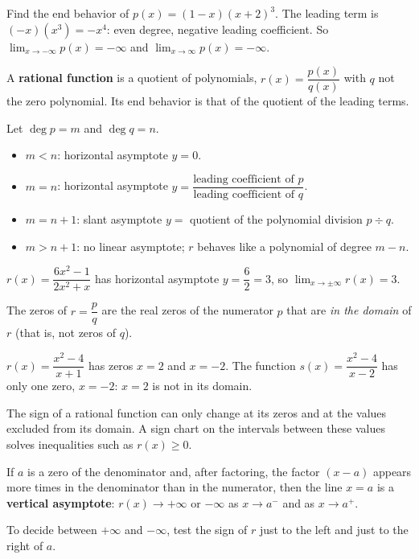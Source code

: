 \documentclass[11pt]{article}
\begin{document}
\begin{example}
Find the end behavior of $p(x)=(1-x)(x+2)^3$.
\sol The leading term is $(-x)(x^3)=-x^4$: even degree, negative leading coefficient. So $\lim_{x\to-\infty}p(x)=-\infty$ and $\lim_{x\to\infty}p(x)=-\infty$.
\end{example}

A \textbf{rational function} is a quotient of polynomials, $r(x)=\dfrac{p(x)}{q(x)}$ with $q$ not the zero polynomial. Its end behavior is that of the quotient of the leading terms.

\begin{keyidea}
Let $\deg p=m$ and $\deg q=n$.
\begin{itemize}
\item $m<n$: horizontal asymptote $y=0$.
\item $m=n$: horizontal asymptote $y=\dfrac{\text{leading coefficient of } p}{\text{leading coefficient of } q}$.
\item $m=n+1$: slant asymptote $y=$ quotient of the polynomial division $p\div q$.
\item $m>n+1$: no linear asymptote; $r$ behaves like a polynomial of degree $m-n$.
\end{itemize}
\end{keyidea}

\begin{example}
$r(x)=\dfrac{6x^2-1}{2x^2+x}$ has horizontal asymptote $y=\dfrac{6}{2}=3$, so $\lim_{x\to\pm\infty}r(x)=3$.
\end{example}

\begin{keyidea}
The zeros of $r=\dfrac{p}{q}$ are the real zeros of the numerator $p$ that are \emph{in the domain} of $r$ (that is, not zeros of $q$).
\end{keyidea}
\begin{example}
$r(x)=\dfrac{x^2-4}{x+1}$ has zeros $x=2$ and $x=-2$. The function $s(x)=\dfrac{x^2-4}{x-2}$ has only one zero, $x=-2$: $x=2$ is not in its domain.
\end{example}
The sign of a rational function can only change at its zeros and at the values excluded from its domain. A sign chart on the intervals between these values solves inequalities such as $r(x)\ge 0$.

\begin{keyidea}
If $a$ is a zero of the denominator and, after factoring, the factor $(x-a)$ appears more times in the denominator than in the numerator, then the line $x=a$ is a \textbf{vertical asymptote}: $r(x)\to+\infty$ or $-\infty$ as $x\to a^-$ and as $x\to a^+$.
\end{keyidea}
To decide between $+\infty$ and $-\infty$, test the sign of $r$ just to the left and just to the right of $a$.
\end{document}
